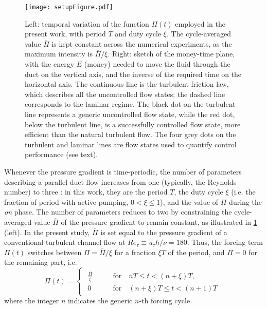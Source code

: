 \documentclass[lineno]{jfm}
\begin{document}
\begin{figure}
\centering
\texttt{[image: setupFigure.pdf]}%
\caption{Left: temporal variation of the function $\Pi(t)$ employed in the present work, with period $T$ and duty cycle $\xi$. The cycle-averaged value $\overline{\Pi}$ is kept constant across the numerical experiments, as the maximum intensity is $\overline{\Pi}/\xi$. Right: sketch of the money-time plane, with the energy $E$ (money) needed to move the fluid through the duct on the vertical axis, and the inverse of the required time on the horizontal axis. The continuous line is the turbulent friction law, which describes all the uncontrolled flow states; the dashed line corresponds to the laminar regime. The black dot on the turbulent line represents a generic uncontrolled flow state, while the red dot, below the turbulent line, is a successfully controlled flow state, more efficient than the natural turbulent flow. The four grey dots on the turbulent and laminar lines are flow states used to quantify control performance (see text).} 
\label{fig:drawings}
\end{figure}

Whenever the pressure gradient is time-periodic, the number of parameters describing a parallel duct flow increases from one (typically, the Reynolds number) to three \citep{akhavan-kamm-shapiro-1991}: in this work, they are the period $T$, the duty cycle $\xi$ (i.e. the fraction of period with active pumping, $0 < \xi \le 1$), and the value of $\Pi$ during the \textit{on} phase.
The number of parameters reduces to two by constraining the cycle-averaged value $\overline{\Pi}$ of the pressure gradient to remain constant, as illustrated in \cref{fig:drawings} (left). In the present study, $\overline{\Pi}$ is set equal to the pressure gradient of a conventional turbulent channel flow at $Re_\tau \equiv u_\tau h / \nu = 180$.
Thus, the forcing term $\Pi(t)$ switches between $\Pi=\overline{\Pi}/\xi$ for a fraction $\xi T$ of the period, and $\Pi=0$ for the remaining part, i.e.
\[
\Pi(t) = 
\begin{cases}
\begin{aligned}
 \frac{\overline{\Pi}}{\xi} \qquad & \mbox{for} \quad nT \le t < (n+\xi) T , \\
 0                           \qquad & \mbox{for} \quad (n+\xi)T \le t < (n+1)T
\end{aligned}
\end{cases}
\]
where the integer $n$ indicates the generic $n$-th forcing cycle.
\end{document}
